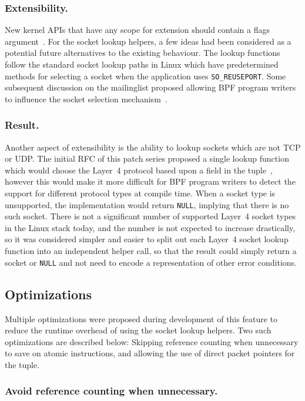 \documentclass[10pt,sigconf,authorversion]{lpc}
\begin{document}
\subsubsection{Extensibility.}

New kernel APIs that have any scope for extension should contain a flags
argument~\cite{syscall-flags}. For the socket lookup helpers, a few ideas had
been considered as a potential future alternatives to the existing behaviour.
The lookup functions follow the standard socket lookup paths in Linux which
have predetermined methods for selecting a socket when the application uses
\verb+SO_REUSEPORT+. Some subsequent discussion on the mailinglist proposed
allowing BPF program writers to influence the socket selection
mechanism~\cite{netdev-sk-select}.

\subsubsection{Result.}

Another aspect of extensibility is the ability to lookup sockets which are not
TCP or UDP. The initial RFC of this patch series proposed a single lookup
function which would choose the Layer~4 protocol based upon a field in the
tuple~\cite{sk-lookup-rfc}, however this would make it more difficult for BPF
program writers to detect the support for different protocol types at compile
time. When a socket type is unsupported, the implementation would return
\verb+NULL+, implying that there is no such socket. There is not a significant
number of supported Layer~4 socket types in the Linux stack today, and the
number is not expected to increase drastically, so it was considered simpler
and easier to split out each Layer~4 socket lookup function into an independent
helper call, so that the result could simply return a socket or \verb+NULL+ and
not need to encode a representation of other error conditions.

\subsection{Optimizations}

Multiple optimizations were proposed during development of this feature to
reduce the runtime overhead of using the socket lookup helpers. Two such
optimizations are described below: Skipping reference counting when unnecessary
to save on atomic instructions, and allowing the use of direct packet pointers
for the tuple.

\subsubsection{Avoid reference counting when unnecessary.}
\end{document}
